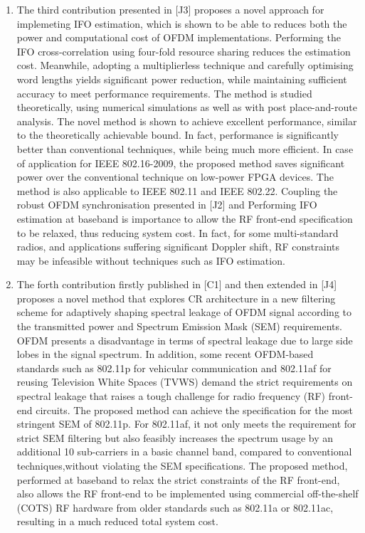 \begin{enumerate}
\item The third contribution presented in [J3] proposes a novel approach for implemeting IFO estimation, which is shown to be able to reduces both the power and computational cost of OFDM implementations.
Performing the IFO cross-correlation using four-fold resource sharing reduces the estimation cost. Meanwhile, adopting a multiplierless technique and carefully optimising word lengths yields significant power reduction, while maintaining sufficient accuracy to meet performance requirements.
The method is studied theoretically, using numerical simulations as well as with post place-and-route analysis.
The novel method is shown to achieve excellent performance, similar to the theoretically achievable bound.
In fact, performance is significantly better than conventional techniques, while being much more efficient.
In case of application for IEEE 802.16-2009, the proposed method saves significant power over the conventional technique on low-power FPGA devices. The method is also applicable to IEEE 802.11 and IEEE 802.22.
Coupling the robust OFDM synchronisation presented in [J2] and Performing IFO estimation at baseband is importance to allow the RF front-end specification to be relaxed, thus reducing system cost.
In fact, for some multi-standard radios, and applications suffering significant Doppler shift, RF constraints may be infeasible without techniques such as IFO estimation.

\item The forth contribution firstly published in [C1] and then extended in [J4] proposes a novel method that explores CR architecture in a new filtering scheme for adaptively shaping spectral leakage of OFDM signal according to the transmitted power and Spectrum Emission Mask (SEM) requirements.
OFDM presents a disadvantage in terms of spectral leakage due to large side lobes in the signal spectrum.
In addition, some recent OFDM-based standards such as 802.11p for vehicular communication and 802.11af for reusing Television White Spaces (TVWS) demand the strict requirements on spectral leakage that raises a tough challenge for radio frequency (RF) front-end circuits.
The proposed method can achieve the specification for the most stringent SEM of 802.11p.
For 802.11af, it not only meets the requirement for strict SEM filtering but also feasibly increases the spectrum usage by an additional 10 sub-carriers in a basic channel band, compared to conventional techniques,without violating the SEM specifications.
The proposed method, performed at baseband to relax the strict constraints of the RF front-end, also allows the RF front-end to be implemented using commercial off-the-shelf (COTS) RF hardware from older standards such as 802.11a or 802.11ac, resulting in a much reduced total system cost.


\end{enumerate}
